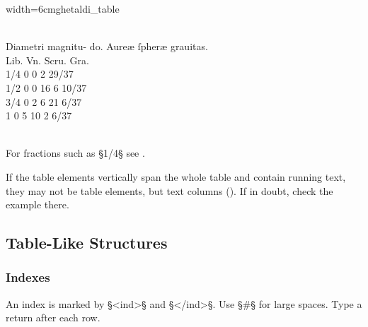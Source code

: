\vspace{3mm}
\begin{sampleImageSmall}{width=6cm}{ghetaldi_table}

\begin{typeLatin}
 \\
Diametri \bold{\bs\bs} magnitu- \bold{\bs\bs} do. \bold{####} Aureæ ſpheræ \bold{\bs\bs} grauitas. \\
 Lib. \bold{#} Vn. \bold{#} Scru. \bold{#} Gra. \\
\bold{\{} 1/4 \bold{\}}  \bold{#} 0 \bold{#} 0 \bold{#} 2 \bold{#} \bold{\{} 29/37 \bold{\}} \\
\bold{\{} 1/2 \bold{\}}  \bold{#} 0 \bold{#} 0 \bold{#} 16 \bold{#} 6 \bold{\{} 10/37 \bold{\}} \\
\bold{\{} 3/4 \bold{\}}  \bold{#} 0 \bold{#} 2 \bold{#} 6 \bold{#} 21 \bold{\{} 6/37 \bold{\}} \\
1 \bold{#} 0 \bold{#} 5 \bold{#} 10  \bold{#} 2 \bold{\{} 6/37 \bold{\}}  \\
 \\
\end{typeLatin}
\end{sampleImageSmall}

\vspace{-5mm}
\begin{crossref}
For fractions such as §{1/4}§ see .
\end{crossref}

\vspace{3mm}
\begin{note}
If the table elements vertically span the whole table and contain running text, they may not be table elements, but text columns (). If in doubt, check the example there.
\end{note}



\tocspace
\subsection{Table-Like Structures}
\label{section table-like structures}

\subsubsection{Indexes}
\label{section indexes}

\begin{mainrule}
An index is marked by §<ind>§ and §</ind>§. Use §#§ for large spaces. Type a return after each row.
\end{mainrule}

